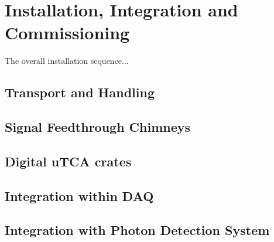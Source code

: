 \section{Installation, Integration and Commissioning}
\label{sec:fddp-tpc-elec-install}

The overall installation sequence...

\subsection{Transport and Handling}
\label{sec:fddp-tpc-elec-install-transport}

\subsection{Signal Feedthrough Chimneys}
\label{sec:fddp-tpc-elec-install-sft}

\subsection{Digital uTCA crates}
\label{sec:fddp-tpc-elec-install-utca}



\subsection{Integration within DAQ}
\label{sec:fddp-tpc-elec-install-daq}

\subsection{Integration with Photon Detection System}
\label{sec:fddp-tpc-elec-install-pmt}

